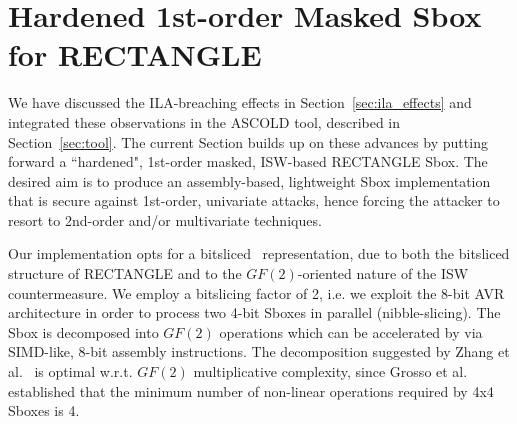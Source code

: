 \section{Hardened 1st-order Masked Sbox for RECTANGLE}\label{sec:rectangle}
We have discussed the ILA-breaching effects in Section~\ref{sec:ila_effects} and integrated these observations in the ASCOLD tool,  described in Section~\ref{sec:tool}. The current Section builds up on these advances by putting forward a ``hardened", 1st-order masked, ISW-based RECTANGLE Sbox. The desired aim is to produce an assembly-based, lightweight Sbox implementation that is secure against 1st-order, univariate attacks, hence forcing the attacker to resort to 2nd-order and/or multivariate techniques. 

Our implementation opts for a bitsliced~\cite{DBLP:conf/fse/DaemenGV93,DBLP:conf/fse/Biham97a} representation, due to both the bitsliced structure of RECTANGLE and to the $GF(2)$-oriented nature of the ISW countermeasure. We employ a bitslicing factor of 2, i.e. we exploit the 8-bit AVR architecture in order to process two 4-bit Sboxes in parallel (nibble-slicing). The Sbox is decomposed into $GF(2)$ operations which can be accelerated by via SIMD-like, 8-bit assembly instructions. The decomposition suggested by Zhang et al.~\cite{DBLP:journals/chinaf/ZhangBLR0V15} is optimal w.r.t. $GF(2)$ multiplicative complexity, since Grosso et al.~\cite{DBLP:conf/fse/GrossoLSV14} established that the minimum number of non-linear operations required by 4x4 Sboxes is 4. 

